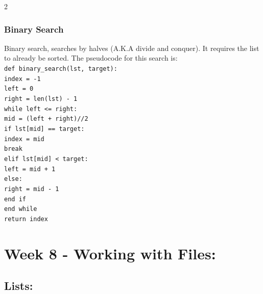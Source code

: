 \documentclass[a4paper]{report}
\begin{document}
\begin{flushleft}
\begin{multicols}{2}
	\subsubsection*{Binary Search}
	Binary search, searches by halves (A.K.A divide and conquer). It requires the list to already be sorted. The pseudocode for this search is:\\
	\texttt{def binary\_search(lst, target):}\\
		\hspace{2em}\texttt{index = -1}\\
		\hspace{2em}\texttt{left = 0}\\
		\hspace{2em}\texttt{right = len(lst) - 1}\\
		\hspace{2em}\texttt{while left <= right:}\\
		\hspace{4em}\texttt{mid = (left + right)//2}\\
			\hspace{4em}\texttt{if lst[mid] == target:}\\
				\hspace{6em}\texttt{index = mid}\\
				\hspace{6em}\texttt{break}\\
			\hspace{4em}\texttt{elif lst[mid] < target:}\\
				\hspace{6em}\texttt{left = mid + 1}\\
			\hspace{4em}\texttt{else:}\\
				\hspace{6em}\texttt{right = mid - 1}\\
			\hspace{4em}\texttt{end if}\\
		\hspace{2em}\texttt{end while}\\
		\hspace{2em}\texttt{return index}
	\hfill\break\break

	\section*{Week 8 - Working with Files:}
	\subsection*{Lists:}

\end{multicols}
\end{flushleft}
\end{document}
